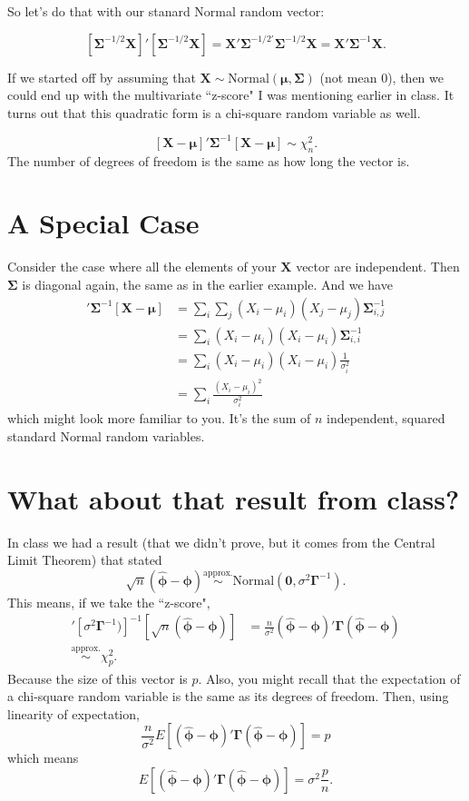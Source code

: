 \documentclass{article}\usepackage[]{graphicx}\usepackage[]{color}
\begin{document}
So let's do that with our stanard Normal random vector:

\[
[\bm{\Sigma}^{-1/2}\mathbf{X}]' [\bm{\Sigma}^{-1/2}\mathbf{X}] = \mathbf{X} ' \bm{\Sigma}^{-1/2 '}\bm{\Sigma}^{-1/2 } \mathbf{X} = \mathbf{X} ' \bm{\Sigma}^{-1} \mathbf{X} .
\]

If we started off by assuming that $\mathbf{X} \sim \text{Normal}(\bm{\mu}, \bm{\Sigma} )$ (not mean $0$), then we could end up with the multivariate ``z-score" I was mentioning earlier in class. It turns out that this quadratic form is a chi-square random variable as well.

\[
[\mathbf{X} - \bm{\mu}] ' \bm{\Sigma}^{-1} [\mathbf{X} - \bm{\mu}]  \sim \chi^2_{n}.
\]
The number of degrees of freedom is the same as how long the vector is.

\section{A Special Case}

Consider the case where all the elements of your $\mathbf{X}$ vector are independent. Then $\bm{\Sigma}$ is diagonal again, the same as in the earlier example. And we have
\begin{align*}
[\mathbf{X} - \bm{\mu}] ' \bm{\Sigma}^{-1} [\mathbf{X} - \bm{\mu}] &= \sum_i \sum_j (X_i - \mu_i)(X_j - \mu_j) \bm{\Sigma}^{-1}_{i,j} \\
&= \sum_i (X_i - \mu_i)(X_i - \mu_i) \bm{\Sigma}^{-1}_{i,i} \tag{only have to worry about diagonals of the matrix} \\
&= \sum_i (X_i - \mu_i)(X_i - \mu_i) \frac{1}{\sigma^2_i} \\
&= \sum_i \frac{ (X_i - \mu_i)^2 }{\sigma^2_i} 
\end{align*}
which might look more familiar to you. It's the sum of $n$ independent, squared standard Normal random variables. 

\section{What about that result from class?}

In class we had a result (that we didn't prove, but it comes from the Central Limit Theorem) that stated 
\[
\sqrt{n}(\hat{\bm{\phi}} - \bm{\phi}) \overset{\text{approx.}}{\sim} \text{Normal}(\bm{0}, \sigma^2 \bm{\Gamma} ^{-1}).
\]
This means, if we take the ``z-score",
\begin{align*}
[\sqrt{n}(\hat{\bm{\phi}} - \bm{\phi})]'[\sigma^2  \bm{\Gamma} ^{-1})]^{-1}  [\sqrt{n}(\hat{\bm{\phi}} - \bm{\phi})]  &= \frac{n}{\sigma^2}(\hat{\bm{\phi}} - \bm{\phi})' \bm{\Gamma} (\hat{\bm{\phi}} - \bm{\phi}) \\
\overset{\text{approx.}}{\sim} \chi^2_p.
\end{align*}
Because the size of this vector is $p$. Also, you might recall that the expectation of a chi-square random variable is the same as its degrees of freedom. Then, using linearity of expectation,
\[
\frac{n}{\sigma^2} E\left[ (\hat{\bm{\phi}} - \bm{\phi})' \bm{\Gamma} (\hat{\bm{\phi}} - \bm{\phi}) \right] = p
\]
which means 
\[
E\left[ (\hat{\bm{\phi}} - \bm{\phi})' \bm{\Gamma} (\hat{\bm{\phi}} - \bm{\phi}) \right] = \sigma^2 \frac{p}{n}.
\]
\end{document}

